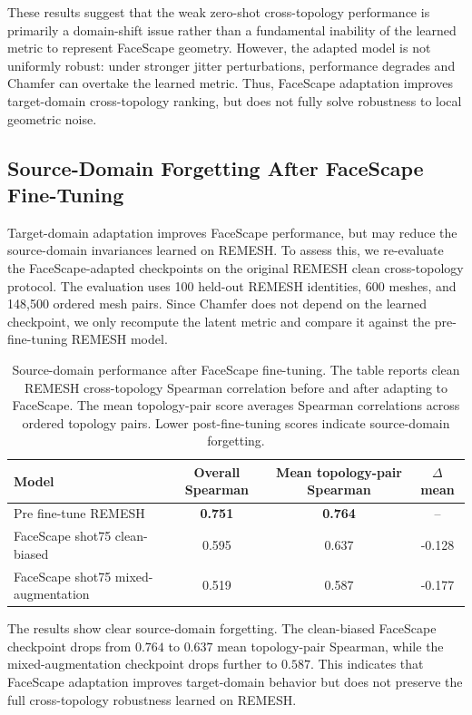\documentclass[10pt,twocolumn,letterpaper]{article}
\begin{document}
These results suggest that the weak zero-shot cross-topology performance is
primarily a domain-shift issue rather than a fundamental inability of the learned
metric to represent FaceScape geometry. However, the adapted model is not
uniformly robust: under stronger jitter perturbations, performance degrades and
Chamfer can overtake the learned metric. Thus, FaceScape adaptation improves
target-domain cross-topology ranking, but does not fully solve robustness to
local geometric noise.

\subsection{Source-Domain Forgetting After FaceScape Fine-Tuning}
\label{app:faceverse_forgetting}

Target-domain adaptation improves FaceScape performance, but may reduce the
source-domain invariances learned on REMESH. To assess this, we re-evaluate the
FaceScape-adapted checkpoints on the original REMESH clean cross-topology
protocol. The evaluation uses 100 held-out REMESH identities, 600 meshes, and
148,500 ordered mesh pairs. Since Chamfer does not depend on the learned
checkpoint, we only recompute the latent metric and compare it against the
pre-fine-tuning REMESH model.

\begin{table}[h]
\centering
\small
\caption{
Source-domain performance after FaceScape fine-tuning. The table reports clean
REMESH cross-topology Spearman correlation before and after adapting to
FaceScape. The mean topology-pair score averages Spearman correlations across
ordered topology pairs. Lower post-fine-tuning scores indicate source-domain
forgetting.
}
\label{tab:faceverse_finetune_forgetting_app}
\begin{tabular}{lccc}
\toprule
Model & Overall Spearman & Mean topology-pair Spearman & $\Delta$ mean \\
\midrule
Pre fine-tune REMESH & \textbf{0.751} & \textbf{0.764} & -- \\
FaceScape shot75 clean-biased & 0.595 & 0.637 & -0.128 \\
FaceScape shot75 mixed-augmentation & 0.519 & 0.587 & -0.177 \\
\bottomrule
\end{tabular}
\end{table}

The results show clear source-domain forgetting. The clean-biased FaceScape
checkpoint drops from $0.764$ to $0.637$ mean topology-pair Spearman, while the
mixed-augmentation checkpoint drops further to $0.587$. This indicates that
FaceScape adaptation improves target-domain behavior but does not preserve the
full cross-topology robustness learned on REMESH.
\end{document}
